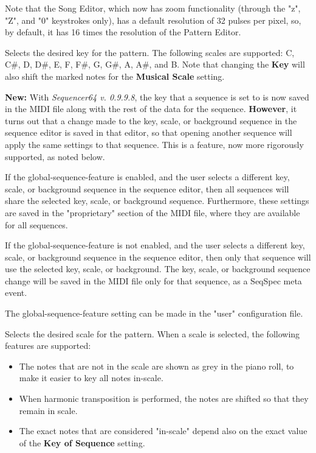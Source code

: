    Note that the Song Editor, which now has zoom functionality (through
   the "z", "Z", and "0" keystrokes only),
   has a default resolution of 32 pulses per pixel, so, by default, it has
   16 times the resolution of the Pattern Editor.

   Selects the desired key for the pattern.  The following scales are
   supported:  C, C\#, D, D\#, E, F, F\#, G, G\#, A, A\#, and B.
   Note that changing the \textbf{Key} will also shift the marked notes
   for the \textbf{Musical Scale} setting.

   \textbf{New:}
   With \textsl{Sequencer64 v. 0.9.9.8}, the key that a sequence is set to is
   now saved in the MIDI file along with the rest of the data for the sequence.
   \textbf{However},
   it turns out that a change made to the key, scale, or background sequence in
   the sequence editor is saved in that editor, so that opening another sequence
   will apply the same settings to that sequence.  This is a feature, now
   more rigorously supported, as noted below.

   If the global-sequence-feature is enabled, and the user selects
   a different key, scale, or background sequence in the sequence editor, 
   then all sequences will share the selected key, scale, or background
   sequence.  Furthermore, these settings are saved in the "proprietary"
   section of the MIDI file, where they are available for all sequences.

   If the global-sequence-feature is not enabled, and the user selects
   a different key, scale, or background sequence in the sequence editor, 
   then only that sequence will use the selected key, scale, or background.
   The key, scale, or background sequence change will be saved in the MIDI file
   only for that sequence, as a SeqSpec meta event.

   The global-sequence-feature setting can be made in the "user" configuration
   file.

   Selects the desired scale for the pattern.
   When a scale is selected, the following features are supported:

   \begin{itemize}
      \item The notes that are not in the scale are shown as grey in the piano
         roll, to make it easier to key all notes in-scale.
      \item When harmonic transposition is performed, the notes are shifted
         so that they remain in scale.
      \item The exact notes that are considered "in-scale" depend also on the 
         exact value of the \textbf{Key of Sequence} setting.
   \end{itemize}

